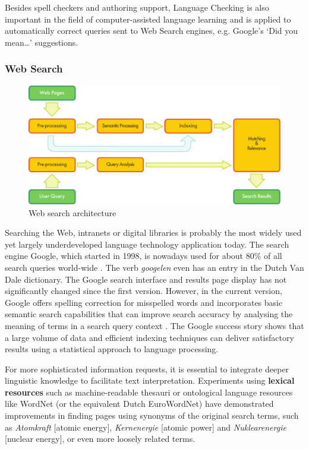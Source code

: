 \begin{multicols}{2}
    Besides spell checkers and authoring support, Language Checking is also important in the field of computer-assisted language learning and is applied to automatically correct queries sent to Web Search engines, e.g. Google's `Did you mean\dots' suggestions.


\subsubsection{Web Search}

\begin{figure}[htb]
  \center
  \includegraphics[width=\textwidth]{../_media/english/web_search_architecture}
  \caption{Web search architecture}
  \label{fig:websearcharch_en}
 \end{figure}

Searching the Web, intranets or digital libraries is probably the most widely used yet largely underdeveloped language technology application today. The search engine Google, which started in 1998, is nowadays used for about 80\% of all search queries world-wide \cite{Spiegel}. The verb \textit{googelen} even has an entry in the Dutch Van Dale dictionary. The Google search interface and results page display has not significantly changed since the first version. However, in the current version, Google offers spelling correction for misspelled words and incorporates basic semantic search capabilities that can improve search accuracy by analysing the meaning of terms in a search query context \cite{GoogleSem}. The Google success story shows that a large volume of data and efficient indexing techniques can deliver satisfactory results using a statistical approach to language processing.

For more sophisticated information requests, it is essential to integrate deeper linguistic knowledge to facilitate text interpretation. Experiments using \textbf{lexical resources} such as machine-readable thesauri or ontological language resources like WordNet (or the equivalent Dutch EuroWordNet) have demonstrated improvements in finding pages using synonyms of the original search terms, such as \textit{Atomkraft} {[}atomic energy{]}, \textit{Kernenergie} {[}atomic power{]} and \textit{Nuklearenergie} {[}nuclear energy{]}, or even more loosely related terms.


\end{multicols}
